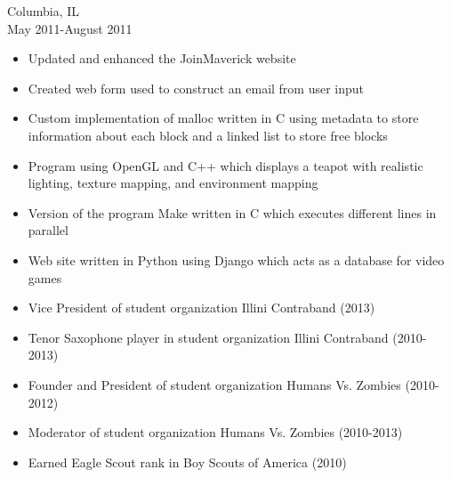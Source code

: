 \documentclass[11pt]{article}
\begin{document}
     \hfill Columbia, IL\\
     \hfill May 2011-August 2011
    \begin{itemize}[noitemsep,topsep=0pt,leftmargin=52pt]
      \item Updated and enhanced the JoinMaverick website
      \item Created web form used to construct an email from user input
    \end{itemize}

  \bigskip

  \begin{itemize}[noitemsep,topsep=0pt]
      \item Custom implementation of malloc written in C using metadata to store information about each block and a linked list to store free blocks
      \item Program using OpenGL and C++ which displays a teapot with realistic lighting, texture mapping, and environment mapping
      \item Version of the program Make written in C which executes different lines in parallel
      \item Web site written in Python using Django which acts as a database for video games
  \end{itemize}

  \bigskip

  \begin{itemize}[noitemsep,topsep=0pt]
    \item Vice President of student organization Illini Contraband \hfill (2013)
    \item Tenor Saxophone player in student organization Illini Contraband \hfill (2010-2013)
    \item Founder and President of student organization Humans Vs. Zombies \hfill (2010-2012)
    \item Moderator of student organization Humans Vs. Zombies \hfill (2010-2013)
    \item Earned Eagle Scout rank in Boy Scouts of America \hfill (2010)
  \end{itemize}
\end{document}
